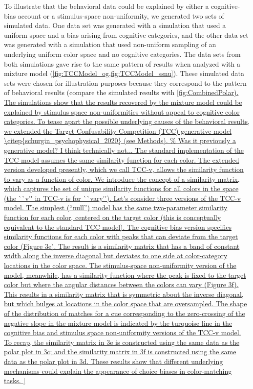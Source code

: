 To illustrate that the behavioral data could be explained by either a cognitive-bias account or a stimulus-space non-uniformity, we generated two sets of simulated data. 
One data set was generated with a simulation that used a uniform space and a bias arising from cognitive categories, and the other data set was generated with a simulation that used non-uniform sampling of an underlying uniform color space and no cognitive categories.
The data sets from both simulations gave rise to the same pattern of results when analyzed with a mixture model (\autoref{fig:TCCModel_og,fig:TCCModel_ssnu}).
These simulated data sets were chosen for illustration purposes because they correspond to the pattern of behavioral results (compare the simulated results with \autoref{fig:CombinedPolar). 
The simulations show that the results recovered by the mixture model could be explained by stimulus space non-uniformities without appeal to cognitive color categories. 

To tease apart the possible underlying causes of the behavioral results, we extended the Target Confusability Competition (TCC) generative model \citep{schurgin_psychophysical_2020} (see Methods). %
The standard implementation of the TCC model assumes the same similarity function for each color. 
The extended version developed presently, which we call TCC-v, allows the similarity function to vary as a function of color.
We introduce the concept of a similarity matrix, which captures the set of unique similarity functions for all colors in the space (the ``v'' in TCC-v is for ``vary'').
Let's consider three versions of the TCC-v model.
The simplest (“null”) model has the same two-parameter similarity function for each color, centered on the target color (this is conceptually equivalent to the standard TCC model).  The cognitive bias version specifies similarity functions for each color with peaks that can deviate from the target color (Figure 3e). The result is a similarity matrix that has a band of constant width along the inverse diagonal but deviates to one side at color-category locations in the color space. The stimulus-space non-uniformity version of the model, meanwhile, has a similarity function where the peak is fixed to the target color but where the angular distances between the colors can vary (Figure 3f). This results in a similarity matrix that is symmetric about the inverse diagonal, but which bulges at locations in the color space that are oversampled. The shape of the distribution of matches for a cue corresponding to the zero-crossing of the negative slope in the mixture model is indicated by the turquoise line in the cognitive bias and stimulus space non-uniformity versions of the TCC-v model. To recap, the similarity matrix in 3e is constructed using the same data as the polar plot in 3c; and the similarity matrix in 3f is constructed using the same data as the polar plot in 3d. These results show that different underlying mechanisms could explain the appearance of choice biases in color-matching tasks.

}
